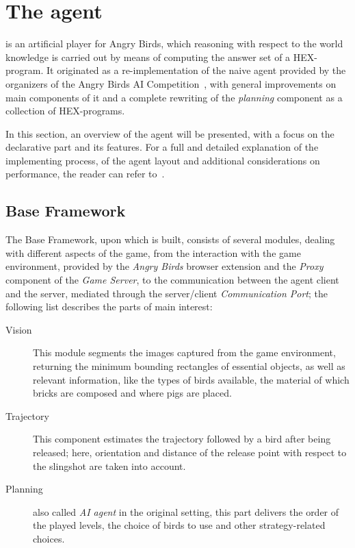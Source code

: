 \section{The \ah agent}
\label{sec:agent}
\ah is an artificial player for Angry
Birds, which reasoning with respect to
the world knowledge is carried out by
means of computing the answer set of a
HEX-program.
It originated as a re-implementation of
the naive agent provided by the organizers
of the Angry Birds AI Competition~\cite{angryAI},
with general improvements on main components
of it and a complete rewriting of the
\emph{planning} component as a collection
of HEX-programs.

In this section, an overview of the \ah
agent will be presented, with a focus on
the declarative part and its features. 
For a full and detailed explanation of
the implementing process, of the agent
layout and additional considerations on
performance, the reader can refer to~\cite{angryhex}.

\subsection{Base Framework}

The Base Framework, upon which \ah is built,
consists of several modules, dealing with
different aspects of the game, from 
the interaction with the game environment,
provided by the \emph{Angry Birds} browser
extension and the \emph{Proxy} component of
the \emph{Game Server}, to the communication
between the agent client and the server,
mediated through the server/client \emph{Communication Port};
the following list describes the parts of main interest:
\begin{description}
    \item[Vision] This module segments the images
    captured from the game environment, returning
    the minimum bounding rectangles of essential
    objects, as well as relevant information,
    like the types of birds available, the material
    of which bricks are composed and where pigs are placed.
    \item[Trajectory] This component estimates
    the trajectory followed by a bird after being
    released; here, orientation and distance of 
    the release point with respect to the slingshot
    are taken into account.
    \item[Planning] also called \emph{AI agent} in the
    original setting, this part delivers the order
    of the played levels, the choice of birds to use
    and other strategy-related choices.
\end{description}

